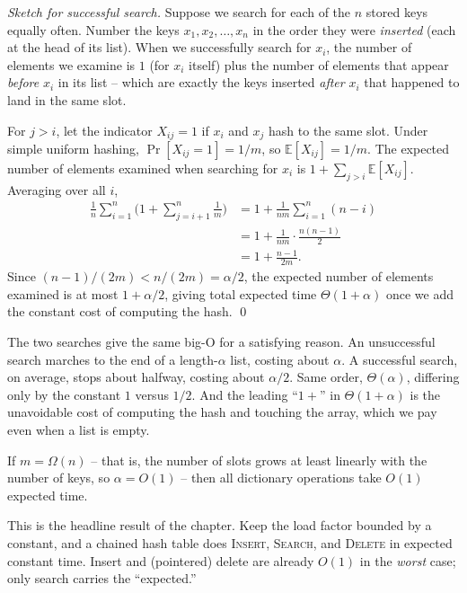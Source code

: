 \begin{proof}[Sketch for successful search]
Suppose we search for each of the $n$ stored keys equally often. Number the keys $x_1, x_2, \dots, x_n$ in the order they were \emph{inserted} (each at the head of its list). When we successfully search for $x_i$, the number of elements we examine is $1$ (for $x_i$ itself) plus the number of elements that appear \emph{before} $x_i$ in its list -- which are exactly the keys inserted \emph{after} $x_i$ that happened to land in the same slot.

For $j > i$, let the indicator $X_{ij} = 1$ if $x_i$ and $x_j$ hash to the same slot. Under simple uniform hashing, $\Pr[X_{ij}=1] = 1/m$, so $\mathbb{E}[X_{ij}] = 1/m$. The expected number of elements examined when searching for $x_i$ is $1 + \sum_{j>i} \mathbb{E}[X_{ij}]$. Averaging over all $i$,
\begin{align*}
  \frac{1}{n}\sum_{i=1}^{n}\Big(1 + \sum_{j=i+1}^{n}\frac{1}{m}\Big)
  &= 1 + \frac{1}{nm}\sum_{i=1}^{n}(n-i) \\
  &= 1 + \frac{1}{nm}\cdot\frac{n(n-1)}{2} \\
  &= 1 + \frac{n-1}{2m}.
\end{align*}
Since $(n-1)/(2m) < n/(2m) = \alpha/2$, the expected number of elements examined is at most $1 + \alpha/2$, giving total expected time $\Theta(1+\alpha)$ once we add the constant cost of computing the hash. \qed
\end{proof}

\begin{intuitionbox}
The two searches give the same big-O for a satisfying reason. An unsuccessful search marches to the end of a length-$\alpha$ list, costing about $\alpha$. A successful search, on average, stops about halfway, costing about $\alpha/2$. Same order, $\Theta(\alpha)$, differing only by the constant $1$ versus $1/2$. And the leading ``$1+$'' in $\Theta(1+\alpha)$ is the unavoidable cost of computing the hash and touching the array, which we pay even when a list is empty.
\end{intuitionbox}

\begin{corollary}
If $m = \Omega(n)$ -- that is, the number of slots grows at least linearly with the number of keys, so $\alpha = O(1)$ -- then all dictionary operations take $O(1)$ expected time.
\end{corollary}

This is the headline result of the chapter. Keep the load factor bounded by a constant, and a chained hash table does \textsc{Insert}, \textsc{Search}, and \textsc{Delete} in expected constant time. Insert and (pointered) delete are already $O(1)$ in the \emph{worst} case; only search carries the ``expected.''

